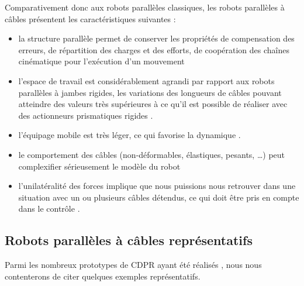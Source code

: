 Comparativement donc aux robots parallèles classiques, les robots parallèles à 
câbles présentent les caractéristiques suivantes :
\begin{itemize}
 \item la structure parallèle permet de conserver les propriétés de 
compensation des erreurs, de répartition des charges et des efforts, de coopération des 
chaînes cinématique pour l'exécution d'un mouvement
 \item l'espace de travail est considérablement agrandi par rapport aux robots 
parallèles à jambes rigides, les variations des longueurs de câbles pouvant 
atteindre des valeurs très supérieures à ce qu'il est possible de réaliser 
avec des actionneurs prismatiques rigides \cite{riehl2010}.
 \item l'équipage mobile est très léger, ce qui favorise la dynamique 
\cite{kawamura1995}.
 \item le comportement des câbles (non-déformables, élastiques, pesants, \dots) 
peut complexifier s\'erieusement le modèle du robot \cite{riehl2009} 
\cite{merlet2004interferences} \cite{lolo2014}
 \item l'unilatéralité des forces implique que nous puissions nous retrouver 
dans une situation avec un ou plusieurs câbles détendus, ce qui doit être pris 
en compte dans le contrôle \cite{merlet2013openissues}.
\end{itemize}


\subsection{Robots parall\`eles à c\^ables repr\'esentatifs} \label{chap0-1-0}

Parmi les nombreux prototypes de CDPR ayant \'et\'e r\'ealis\'es 
\cite{kawamura1995} \cite{agrawal2005} \cite{fast2011}, nous nous contenterons 
de citer quelques exemples repr\'esentatifs.\\

